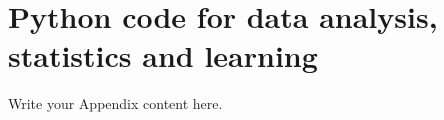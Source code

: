 
\chapter{Python code for data analysis, statistics and learning} %

\label{AppendixA} %

Write your Appendix content here.